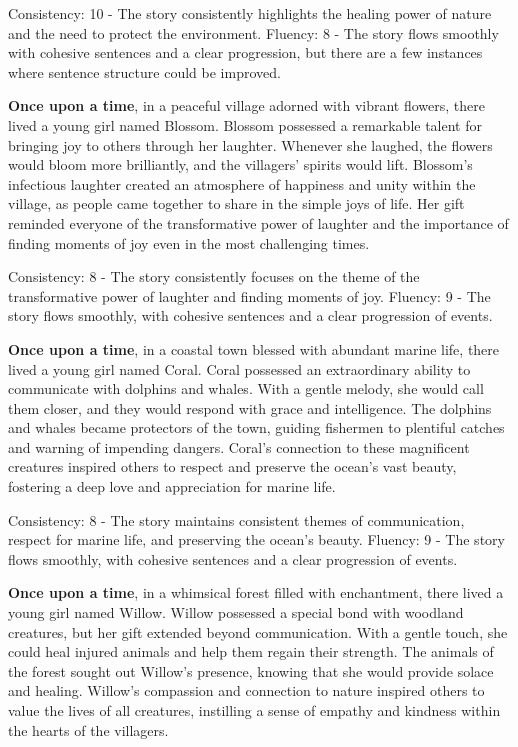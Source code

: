 \documentclass{article}
\begin{document}
Consistency: 10 - The story consistently highlights the healing power of nature and the need to protect the environment.
Fluency: 8 - The story flows smoothly with cohesive sentences and a clear progression, but there are a few instances where sentence structure could be improved.

\textbf{Once upon a time}, in a peaceful village adorned with vibrant flowers, there lived a young girl named Blossom. Blossom possessed a remarkable talent for bringing joy to others through her laughter. Whenever she laughed, the flowers would bloom more brilliantly, and the villagers' spirits would lift. Blossom's infectious laughter created an atmosphere of happiness and unity within the village, as people came together to share in the simple joys of life. Her gift reminded everyone of the transformative power of laughter and the importance of finding moments of joy even in the most challenging times.

Consistency: 8 - The story consistently focuses on the theme of the transformative power of laughter and finding moments of joy.
Fluency: 9 - The story flows smoothly, with cohesive sentences and a clear progression of events.

\textbf{Once upon a time}, in a coastal town blessed with abundant marine life, there lived a young girl named Coral. Coral possessed an extraordinary ability to communicate with dolphins and whales. With a gentle melody, she would call them closer, and they would respond with grace and intelligence. The dolphins and whales became protectors of the town, guiding fishermen to plentiful catches and warning of impending dangers. Coral's connection to these magnificent creatures inspired others to respect and preserve the ocean's vast beauty, fostering a deep love and appreciation for marine life.

Consistency: 8 - The story maintains consistent themes of communication, respect for marine life, and preserving the ocean's beauty.
Fluency: 9 - The story flows smoothly, with cohesive sentences and a clear progression of events.

\textbf{Once upon a time}, in a whimsical forest filled with enchantment, there lived a young girl named Willow. Willow possessed a special bond with woodland creatures, but her gift extended beyond communication. With a gentle touch, she could heal injured animals and help them regain their strength. The animals of the forest sought out Willow's presence, knowing that she would provide solace and healing. Willow's compassion and connection to nature inspired others to value the lives of all creatures, instilling a sense of empathy and kindness within the hearts of the villagers.
\end{document}
